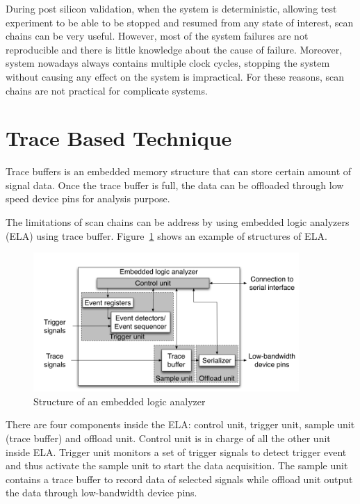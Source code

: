 \documentclass[12pt,frontmatter,copyright,thesis]{usfmanus}
\begin{document}
During post silicon validation, when the system is deterministic,
allowing test experiment to be able to be stopped and resumed
from any state of interest,
scan chains can be very useful.
However, most of the system failures are not reproducible and 
there is little knowledge about
the cause of failure. Moreover,
system nowadays always contains multiple
clock cycles, stopping the system
without causing any effect on the
system is impractical. For these reasons, scan chains are not
practical for complicate systems.

\section{Trace Based Technique}
Trace buffers is an embedded memory structure that can 
store certain amount of signal data. Once the trace buffer is full, 
the data can be offloaded through low speed device pins for analysis
purpose.

The limitations of scan chains can be address by using embedded logic analyzers (ELA)
using trace buffer. Figure~\ref{tb} shows an example of structures
of ELA.
\begin{figure}[h]
\centering
\includegraphics[width=0.9\textwidth]{tracebuffer.png}
\caption{Structure of an embedded logic analyzer~\cite{nicolici2009design}}
\label{tb}
\end{figure}
There are four components inside the ELA: control unit,
trigger unit, sample unit (trace buffer) and offload unit.
Control unit is in charge of all the other unit inside ELA.
Trigger unit monitors a set of trigger signals to detect
trigger event and thus activate the sample unit to
start the data acquisition. The sample unit contains a trace
buffer to record data of selected signals while
offload unit output the data through low-bandwidth device pins.
\end{document}

